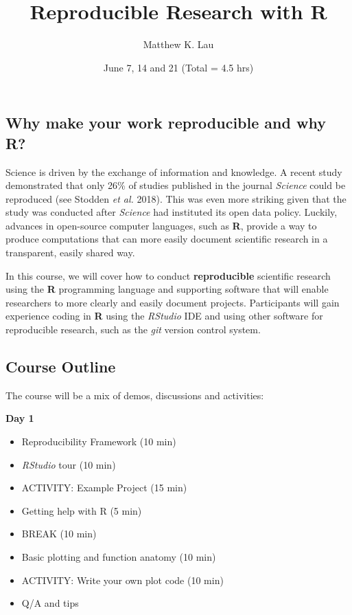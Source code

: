\documentclass[11pt,]{article}
\title{Reproducible Research with R}
\author{Matthew K. Lau}
\date{June 7, 14 and 21 (Total = 4.5 hrs)}
\providecommand{\tightlist}{%
  \setlength{\itemsep}{0pt}\setlength{\parskip}{0pt}}
\begin{document}
\maketitle

\hypertarget{why-make-your-work-reproducible-and-why-r}{%
\subsection{Why make your work reproducible and why
R?}\label{why-make-your-work-reproducible-and-why-r}}

Science is driven by the exchange of information and knowledge. A recent
study demonstrated that only 26\% of studies published in the journal
\emph{Science} could be reproduced (see Stodden \emph{et al.} 2018).
This was even more striking given that the study was conducted after
\emph{Science} had instituted its open data policy. Luckily, advances in
open-source computer languages, such as \textbf{R}, provide a way to
produce computations that can more easily document scientific research
in a transparent, easily shared way.

In this course, we will cover how to conduct \textbf{reproducible}
scientific research using the \textbf{R} programming language and
supporting software that will enable researchers to more clearly and
easily document projects. Participants will gain experience coding in
\textbf{R} using the \emph{RStudio} IDE and using other software for
reproducible research, such as the \emph{git} version control system.

\hypertarget{course-outline}{%
\subsection{Course Outline}\label{course-outline}}

The course will be a mix of demos, discussions and activities:

\textbf{Day 1}

\begin{itemize}
\tightlist
\item
  Reproducibility Framework (10 min)
\item
  \emph{RStudio} tour (10 min)
\item
  ACTIVITY: Example Project (15 min)
\item
  Getting help with R (5 min)
\item
  BREAK (10 min)
\item
  Basic plotting and function anatomy (10 min)
\item
  ACTIVITY: Write your own plot code (10 min)
\item
  Q/A and tips
\end{itemize}
\end{document}
